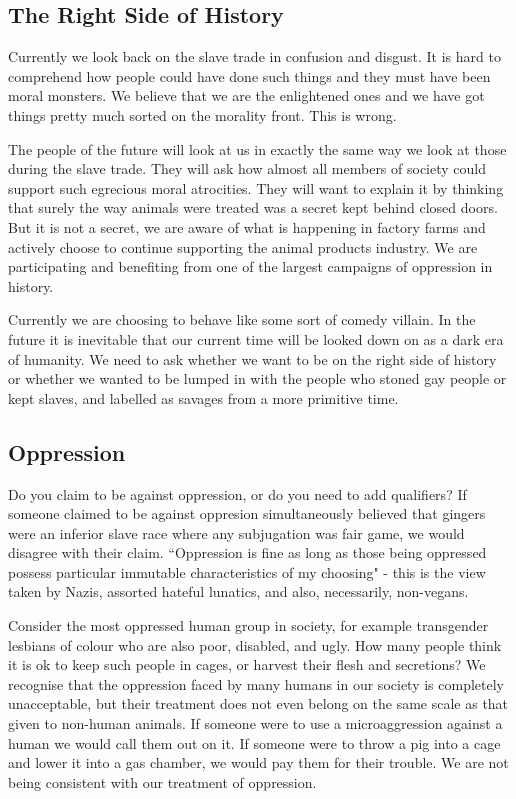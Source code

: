 \subsection{The Right Side of History}

Currently we look back on the slave trade in confusion and disgust. It is hard to comprehend how people could have done such things and they must have been moral monsters. We believe that we are the enlightened ones and we have got things pretty much sorted on the morality front. This is wrong.

The people of the future will look at us in exactly the same way we look at those during the slave trade. They will ask how almost all members of society could support such egrecious moral atrocities. They will want to explain it by thinking that surely the way animals were treated was a secret kept behind closed doors. But it is not a secret, we are aware of what is happening in factory farms and actively choose to continue supporting the animal products industry. We are participating and benefiting from one of the largest campaigns of oppression in history.

Currently we are choosing to behave like some sort of comedy villain. In the future it is inevitable that our current time will be looked down on as a dark era of humanity. We need to ask whether we want to be on the right side of history or whether we wanted to be lumped in with the people who stoned gay people or kept slaves, and labelled as savages from a more primitive time.

\subsection{Oppression}

Do you claim to be against oppression, or do you need to add qualifiers? If someone claimed to be against oppresion simultaneously believed that gingers were an inferior slave race where any subjugation was fair game, we would disagree with their claim. ``Oppression is fine as long as those being oppressed possess particular immutable characteristics of my choosing" - this is the view taken by Nazis, assorted hateful lunatics, and also, necessarily, non-vegans.

Consider the most oppressed human group in society, for example transgender lesbians of colour who are also poor, disabled, and ugly. How many people think it is ok to keep such people in cages, or harvest their flesh and secretions? We recognise that the oppression faced by many humans in our society is completely unacceptable, but their treatment does not even belong on the same scale as that given to non-human animals. If someone were to use a microaggression against a human we would call them out on it. If someone were to throw a pig into a cage and lower it into a gas chamber, we would pay them for their trouble. We are not being consistent with our treatment of oppression. 


